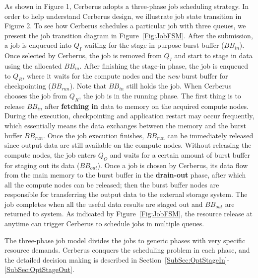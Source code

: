 As shown in Figure 1, Cerberus adopts a three-phase job scheduling strategy. 
In order to help understand Cerberus design, we illustrate job state transition in Figure 2.
To see how Cerberus schedules a particular job with three queues,
we present the job transition diagram in Figure~\ref{Fig:JobFSM}.
After the submission, a job is enqueued into $Q_I$ waiting for the stage-in-purpose burst buffer ($BB_{in}$).
Once selected by Cerberus, the job is removed from $Q_I$ and start to stage in data using the allocated $BB_{in}$.
After finishing the stage-in phase, the job is enqueued to $Q_R$,
where it waits for the compute nodes and the \textit{new} burst buffer for checkpointing ($BB_{run}$).
Note that $BB_{in}$ still holds the job. When Cerberus chooses the job from $Q_R$, the job is in the running phase.
The first thing is to release $BB_{in}$ after \textbf{fetching in} data to memory on the acquired compute nodes.
During the execution, checkpointing and application restart may occur frequently,
which essentially means the data exchanges between the memory and the burst buffer $BB_{run}$.
Once the job execution finishes, $BB_{run}$ can be immediately released since
output data are still available on the compute nodes.
Without releasing the compute nodes, the job enters $Q_O$ and waits for a certain amount of burst buffer for staging out its data ($BB_{out}$).
Once a job is chosen by Cerberus, its data flow from the main memory to the burst buffer
in the \textbf{drain-out} phase, after which all the compute nodes can be released;
then the burst buffer nodes are responsible for transferring the output data to the external storage system.
The job completes when all the useful data results are staged out and $BB_{out}$ are returned to system.
As indicated by Figure~\ref{Fig:JobFSM}, the resource release at anytime can trigger Cerberus
to schedule jobs in multiple queues.

The three-phase job model divides the jobs to generic phases with very specific resource demands.
Cerberus conquers the scheduling problem in each phase, and the detailed decision making is described in Section~\ref{SubSec:OptStageIn}-\ref{SubSec:OptStageOut}.

